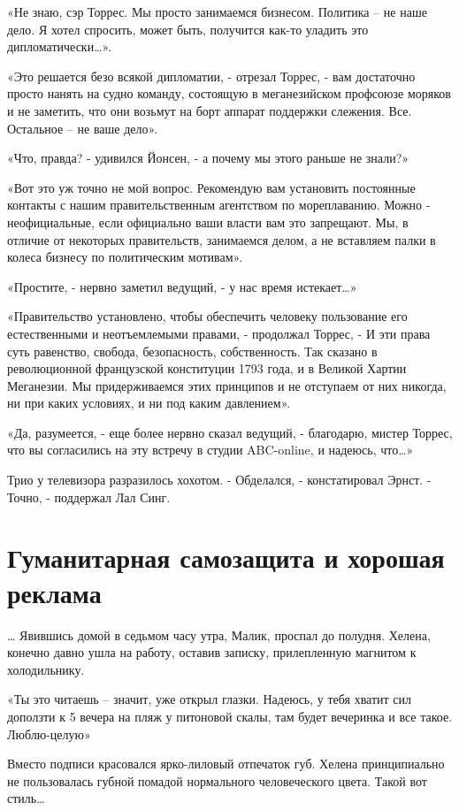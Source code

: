 \documentclass[10pt,final]{book}
\begin{document}
«Не знаю, сэр Торрес. Мы просто занимаемся бизнесом. Политика -- не наше дело. Я хотел спросить, может быть, получится как-то уладить это дипломатически\ldots{}».

«Это решается безо всякой дипломатии, - отрезал Торрес, - вам достаточно просто нанять на судно команду, состоящую в меганезийском профсоюзе моряков и не заметить, что они возьмут на борт аппарат поддержки слежения. Все. Остальное -- не ваше дело».

«Что, правда? - удивился Йонсен, - а почему мы этого раньше не знали?»

«Вот это уж точно не мой вопрос. Рекомендую вам установить постоянные контакты с нашим правительственным агентством по мореплаванию. Можно - неофициальные, если официально ваши власти вам это запрещают. Мы, в отличие от некоторых правительств, занимаемся делом, а не вставляем палки в колеса бизнесу по политическим мотивам».

«Простите, - нервно заметил ведущий, - у нас время истекает\ldots{}»

«Правительство установлено, чтобы обеспечить человеку пользование его естественными и неотъемлемыми правами, - продолжал Торрес, - И эти права суть равенство, свобода, безопасность, собственность. Так сказано в революционной французской конституции 1793 года, и в Великой Хартии Меганезии. Мы придерживаемся этих принципов и не отступаем от них никогда, ни при каких условиях, и ни под каким давлением».

«Да, разумеется, - еще более нервно сказал ведущий, - благодарю, мистер Торрес, что вы согласились на эту встречу в студии ABC-online, и надеюсь, что\ldots{}»

Трио у телевизора разразилось хохотом.
- Обделался, - констатировал Эрнст.
- Точно, - поддержал Лал Синг.



\chapter{Гуманитарная самозащита и хорошая реклама}


\ldots{} Явившись домой в седьмом часу утра, Малик, проспал до полудня. Хелена, конечно давно ушла на работу, оставив записку, прилепленную магнитом к холодильнику.

«Ты это читаешь -- значит, уже открыл глазки. Надеюсь, у тебя хватит сил доползти к 5 вечера на пляж у питоновой скалы, там будет вечеринка и все такое. Люблю-целую»

Вместо подписи красовался ярко-лиловый отпечаток губ. Хелена принципиально не пользовалась губной помадой нормального человеческого цвета. Такой вот стиль\ldots{}
\end{document}
